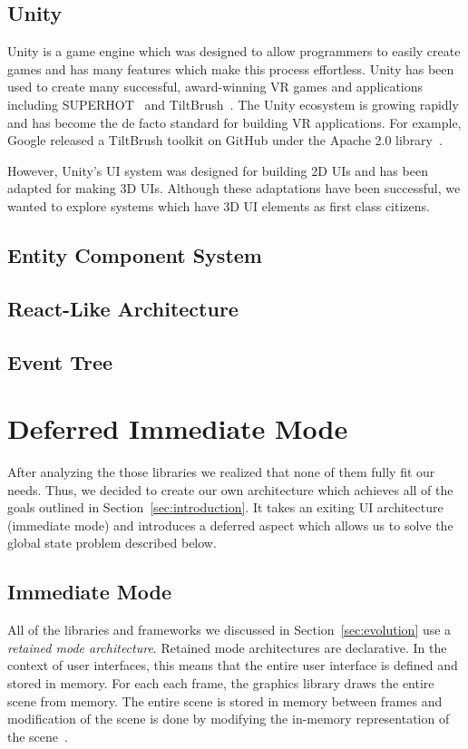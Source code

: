 \documentclass[conference,12pt]{IEEEtran}
\begin{document}
\subsection{Unity}\label{sec:unity}
Unity is a game engine which was designed to allow programmers to easily create
games and has many features which make this process effortless. Unity has been
used to create many successful, award-winning VR games and applications
including SUPERHOT~\cite{UploadVR:SUPERHOT} and
TiltBrush~\cite{Unity:TiltBrush}. The Unity ecosystem is growing rapidly and has
become the de facto standard for building VR applications. For example, Google
released a TiltBrush toolkit on GitHub under the Apache 2.0
library~\cite{Google:TiltBrush}.

However, Unity's UI system was designed for building 2D UIs and has been adapted
for making 3D UIs. Although these adaptations have been successful, we wanted to
explore systems which have 3D UI elements as first class citizens.

\subsection{Entity Component System}\label{sec:ecs}

\subsection{React-Like Architecture}\label{sec:react}

\subsection{Event Tree}\label{sec:event-tree}

\section{Deferred Immediate Mode}\label{sec:dim}

After analyzing the those libraries we realized that none of them fully fit our
needs. Thus, we decided to create our own architecture which achieves all of the
goals outlined in Section~\ref{sec:introduction}. It takes an exiting UI
architecture (immediate mode) and introduces a deferred aspect which allows us
to solve the global state problem described below.

\subsection{Immediate Mode}
All of the libraries and frameworks we discussed in Section~\ref{sec:evolution}
use a \textit{retained mode architecture}. Retained mode architectures are
declarative. In the context of user interfaces, this means that the entire user
interface is defined and stored in memory. For each each frame, the graphics
library draws the entire scene from memory. The entire scene is stored in memory
between frames and modification of the scene is done by modifying the in-memory
representation of the scene~\cite{Microsoft:Retained-vs-Immediate}.
\end{document}
